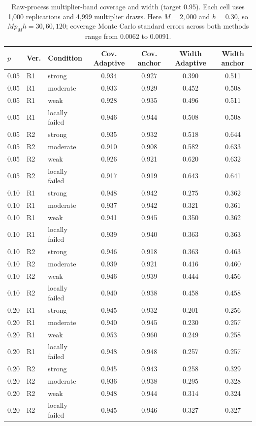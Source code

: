 \begin{table}[p]
\centering
\caption{Raw-process multiplier-band coverage and width (target 0.95). Each cell uses 1,000 replications and 4,999 multiplier draws. Here $M=2{,}000$ and $h=0.30$, so $Mp_Mh=30,60,120$; coverage Monte Carlo standard errors across both methods range from 0.0062 to 0.0091.}
\label{tab:sim-bands}
\begin{tabular}{lllcccc}
\toprule
$p$ & Ver. & Condition & Cov. Adaptive & Cov. anchor & Width Adaptive & Width anchor \\
\midrule
0.05 & R1 & strong & 0.934 & 0.927 & 0.390 & 0.511 \\
0.05 & R1 & moderate & 0.933 & 0.929 & 0.452 & 0.508 \\
0.05 & R1 & weak & 0.928 & 0.935 & 0.496 & 0.511 \\
0.05 & R1 & locally failed & 0.946 & 0.944 & 0.508 & 0.508 \\
0.05 & R2 & strong & 0.935 & 0.932 & 0.518 & 0.644 \\
0.05 & R2 & moderate & 0.910 & 0.908 & 0.582 & 0.633 \\
0.05 & R2 & weak & 0.926 & 0.921 & 0.620 & 0.632 \\
0.05 & R2 & locally failed & 0.917 & 0.919 & 0.643 & 0.641 \\
0.10 & R1 & strong & 0.948 & 0.942 & 0.275 & 0.362 \\
0.10 & R1 & moderate & 0.937 & 0.942 & 0.321 & 0.361 \\
0.10 & R1 & weak & 0.941 & 0.945 & 0.350 & 0.362 \\
0.10 & R1 & locally failed & 0.939 & 0.940 & 0.363 & 0.363 \\
0.10 & R2 & strong & 0.946 & 0.918 & 0.363 & 0.463 \\
0.10 & R2 & moderate & 0.939 & 0.921 & 0.416 & 0.460 \\
0.10 & R2 & weak & 0.946 & 0.939 & 0.444 & 0.456 \\
0.10 & R2 & locally failed & 0.940 & 0.938 & 0.458 & 0.458 \\
0.20 & R1 & strong & 0.945 & 0.932 & 0.201 & 0.256 \\
0.20 & R1 & moderate & 0.940 & 0.945 & 0.230 & 0.257 \\
0.20 & R1 & weak & 0.953 & 0.960 & 0.249 & 0.258 \\
0.20 & R1 & locally failed & 0.948 & 0.948 & 0.257 & 0.257 \\
0.20 & R2 & strong & 0.945 & 0.943 & 0.258 & 0.329 \\
0.20 & R2 & moderate & 0.936 & 0.938 & 0.295 & 0.328 \\
0.20 & R2 & weak & 0.948 & 0.944 & 0.314 & 0.324 \\
0.20 & R2 & locally failed & 0.945 & 0.946 & 0.327 & 0.327 \\
\bottomrule
\end{tabular}
\end{table}

